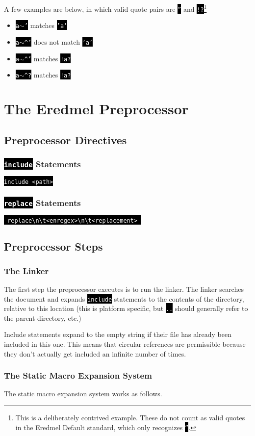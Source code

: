 \documentclass{book}
\newcommand{\code}{\texttt}
\newcommand{\codebox}[1]{\leavevmode\colorbox{black}{\textcolor{white}{\code{#1}}}}
\newcommand{\bak}{\textbackslash}
\newcommand{\til}{$\sim$}
\newcommand{\tab}{\bak{}t}
\begin{document}
A few examples are below, in which valid quote pairs are \codebox{''} and \codebox{!?}\footnote{This is a deliberately contrived example. These do not count as valid quotes in the Eredmel Default standard, which only recognizes \codebox{''}.}

\begin{itemize}
\item \codebox{a\til'} matches \codebox{'a'}
\item \codebox{a\til\^{}'} does not match \codebox{'a'}
\item \codebox{a\til\^{}'} matches \codebox{!a?}
\item \codebox{a\til\^{}?} matches \codebox{!a?}
\end{itemize}

\chapter{The Eredmel Preprocessor}

\section{Preprocessor Directives}

\subsection{\codebox{include} Statements}

\codebox{include <path>}

\subsection{\codebox{replace} Statements}

\codebox{
replace\bak{}n\tab<enregex>\bak{n}\tab<replacement>
}

\section{Preprocessor Steps}

\subsection{The Linker}

The first step the preprocessor executes is to run the linker. The linker searches the document and expands \codebox{include} statements to the contents of the directory, relative to this location (this is platform specific, but \codebox{..} should generally refer to the parent directory, etc.)

Include statements expand to the empty string if their file has already been included in this one. This means that circular references are permissible because they don't actually get included an infinite number of times.

\subsection{The Static Macro Expansion System}

The static macro expansion system works as follows. 
\end{document}
